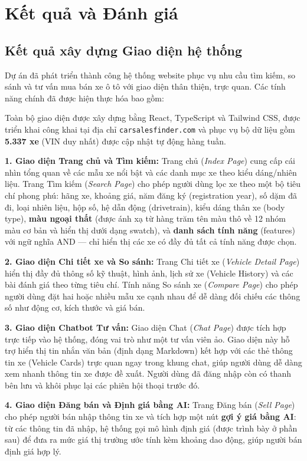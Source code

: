 \section{Kết quả và Đánh giá}

\subsection{Kết quả xây dựng Giao diện hệ thống}
Dự án đã phát triển thành công hệ thống website phục vụ nhu cầu tìm kiếm, so sánh và tư vấn mua bán xe ô tô với giao diện thân thiện, trực quan. Các tính năng chính đã được hiện thực hóa bao gồm:

Toàn bộ giao diện được xây dựng bằng React, TypeScript và Tailwind CSS, được triển khai công khai tại địa chỉ \texttt{carsalesfinder.com} và phục vụ bộ dữ liệu gồm \textbf{5.337 xe} (VIN duy nhất) được cập nhật tự động hàng tuần.

\textbf{1. Giao diện Trang chủ và Tìm kiếm:}
Trang chủ (\textit{Index Page}) cung cấp cái nhìn tổng quan về các mẫu xe nổi bật và các danh mục xe theo kiểu dáng/nhiên liệu. Trang Tìm kiếm (\textit{Search Page}) cho phép người dùng lọc xe theo một bộ tiêu chí phong phú: hãng xe, khoảng giá, năm đăng ký (registration year), số dặm đã đi, loại nhiên liệu, hộp số, hệ dẫn động (drivetrain), kiểu dáng thân xe (body type), \textbf{màu ngoại thất} (được ánh xạ từ hàng trăm tên màu thô về 12 nhóm màu cơ bản và hiển thị dưới dạng swatch), và \textbf{danh sách tính năng} (features) với ngữ nghĩa AND — chỉ hiển thị các xe có đầy đủ tất cả tính năng được chọn.

\textbf{2. Giao diện Chi tiết xe và So sánh:}
Trang Chi tiết xe (\textit{Vehicle Detail Page}) hiển thị đầy đủ thông số kỹ thuật, hình ảnh, lịch sử xe (Vehicle History) và các bài đánh giá theo từng tiêu chí. Tính năng So sánh xe (\textit{Compare Page}) cho phép người dùng đặt hai hoặc nhiều mẫu xe cạnh nhau để dễ dàng đối chiếu các thông số như động cơ, kích thước và giá bán.

\textbf{3. Giao diện Chatbot Tư vấn:}
Giao diện Chat (\textit{Chat Page}) được tích hợp trực tiếp vào hệ thống, đóng vai trò như một tư vấn viên ảo. Giao diện này hỗ trợ hiển thị tin nhắn văn bản (định dạng Markdown) kết hợp với các thẻ thông tin xe (Vehicle Cards) trực quan ngay trong khung chat, giúp người dùng dễ dàng xem nhanh thông tin xe được đề xuất. Người dùng đã đăng nhập còn có thanh bên lưu và khôi phục lại các phiên hội thoại trước đó.

\textbf{4. Giao diện Đăng bán và Định giá bằng AI:}
Trang Đăng bán (\textit{Sell Page}) cho phép người bán nhập thông tin xe và tích hợp một nút \textbf{gợi ý giá bằng AI}: từ các thông tin đã nhập, hệ thống gọi mô hình định giá (được trình bày ở phần sau) để đưa ra mức giá thị trường ước tính kèm khoảng dao động, giúp người bán định giá hợp lý.


